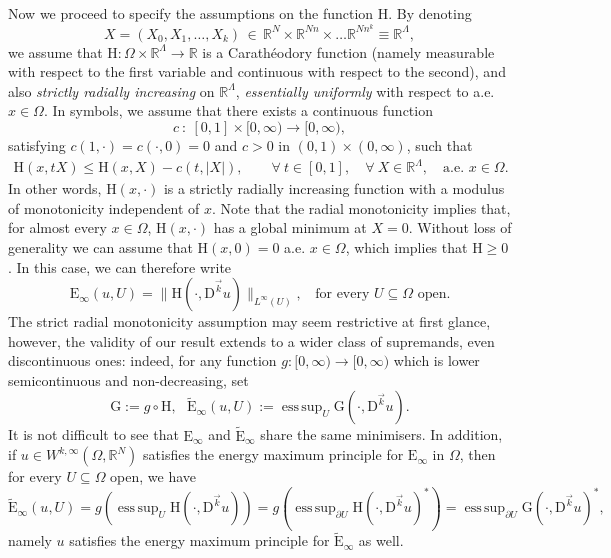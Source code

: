 \documentclass[a4paper,11pt]{article}
\numberwithin{equation}{section}
\newcommand{\numberset}{\mathbb}
\newcommand{\Om}{\Omega}
\newcommand{\R}{\numberset{R}}
\newcommand{\rom}{\mathrm}
\DeclareMathOperator*{\esssup}{ess\,sup}
\theoremstyle{definition}
\begin{document}
Now we proceed to specify the assumptions on the function $\rom{H}$. By denoting 
\[
X=(X_0,X_1,\ldots,X_k) \, \in \, \R^N\times \R^{Nn}\times\ldots\R^{Nn^k}\equiv \R^\Lambda, 
\]
we assume that $\rom{H}:\Om\times\R^\Lambda\longrightarrow \R$ is a Carathéodory function (namely measurable with respect to the first variable and continuous with respect to the second), and also \textit{strictly radially increasing} on $\R^\Lambda$, {\it essentially uniformly} with respect to a.e.\ $x\in \Omega$. In symbols, we assume that there exists a continuous function 
\[
c\ :\ [0,1]\times[0,\infty)\longrightarrow [0,\infty), 
\]
satisfying $c(1,\cdot)=c(\cdot,0)=0$ and $c>0$ in $(0,1)\times(0,\infty)$, such that
\begin{align}\label{strong mon}
\rom{H}(x,tX)\leq \rom{H}(x,X)-c(t,|X|),\qquad\forall\  t\in[0,1],\quad\forall\  X\in\R^\Lambda,\quad\mbox{a.e. }x\in \Om.
\end{align}
In other words, $\mathrm H(x,\cdot)$ is a strictly radially increasing function with a modulus of monotonicity independent of $x$.
Note that the radial monotonicity implies that, for almost every $x\in\Om$, $\rom{H}(x,\cdot)$ has a global minimum at $X=0$. Without loss of generality we can assume that $\rom{H}(x,0)=0$ a.e. $x\in\Om$, which implies that $\rom{H}\geq 0$. In this case, we can therefore write
\[
\mathrm E_\infty(u,U)=\|\rom{H}(\cdot, \mathrm D^{\vec{k}}u)\|_{L^\infty(U)},\ \ \ \ \text{for every $U\subseteq\Om$ open.}
\]
The strict radial monotonicity assumption may seem restrictive at first glance, however, the validity of our result extends to a wider class of supremands, even discontinuous ones: indeed, for any function $g:[0,\infty)\longrightarrow [0,\infty)$ which is lower semicontinuous and non-decreasing, set 
\[
\rom G:=g\circ \rom H, \ \ \ \mathrm{\tilde E}_{\infty}(u,U):=\esssup_U \rom G(\cdot,\mathrm D^{\vec{k}} u). 
\]
It is not difficult to see that $\mathrm E_\infty$ and $\mathrm{\tilde E}_{\infty}$ share the same minimisers. In addition, if $u\in W^{k,\infty}(\Om,\R^N)$ satisfies the energy maximum principle for $\mathrm E_\infty$ in $\Om$, then for every $U\subseteq\Om$ open, we have
$$
\mathrm{\tilde E}_{\infty}(u,U)=g\left(\esssup_U \rom{H}(\cdot, \mathrm D^{\vec{k}}u)\right)=g\left(\esssup_{\partial U}\rom{H}(\cdot, \mathrm D^{\vec{k}}u)^*\right)= \esssup_{\partial U}\rom G(\cdot, \mathrm D^{\vec{k}}u)^*,
$$ 
namely $u$ satisfies the energy maximum principle for $\mathrm{\tilde E}_{\infty}$ as well. 
\end{document}
